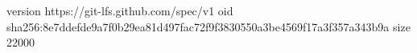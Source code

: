 version https://git-lfs.github.com/spec/v1
oid sha256:8e7ddefde9a7f0b29ea81d497fac72f9f3830550a3be4569f17a3f357a343b9a
size 22000
